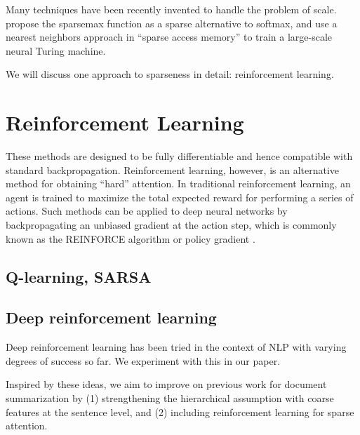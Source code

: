 \documentclass[11pt]{report}
\begin{document}


Many techniques have been recently invented to handle the problem of scale. \cite{martins2016sparsemax} propose the sparsemax function as a sparse alternative to softmax, and \cite{rae2016sparsememory} use a nearest neighbors approach in ``sparse access memory'' to train a large-scale neural Turing machine.


We will discuss one approach to sparseness in detail: reinforcement learning.

\section{Reinforcement Learning}

These methods are designed to be fully differentiable and hence compatible with standard backpropagation. Reinforcement learning, however, is an alternative method for obtaining ``hard'' attention. In traditional reinforcement learning, an agent is trained to maximize the total expected reward for performing a series of actions. Such methods can be applied to deep neural networks by backpropagating an unbiased gradient at the action step, which is commonly known as the REINFORCE algorithm or policy gradient \citep{williams1992reinforce, schulman2015backprop}.

\subsection{Q-learning, SARSA}

\subsection{Deep reinforcement learning}

Deep reinforcement learning has been tried in the context of NLP \citep{zaremba2015rlntm, ranzato2015, li2016dialogueRL} with varying degrees of success so far. We experiment with this in our paper.



Inspired by these ideas, we aim to improve on previous work for document summarization by (1) strengthening the hierarchical assumption with coarse features at the sentence level, and (2) including reinforcement learning for sparse attention.
\end{document}
